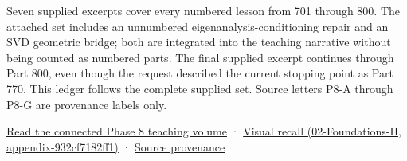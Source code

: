 Seven supplied excerpts cover every numbered lesson from 701 through 800. The attached set includes an unnumbered eigenanalysis-conditioning repair and an SVD geometric bridge; both are integrated into the teaching narrative without being counted as numbered parts. The final supplied excerpt continues through Part 800, even though the request described the current stopping point as Part 770. This ledger follows the complete supplied set. Source letters P8-A through P8-G are provenance labels only.

\hyperref[01-foundations-i-ch019-the-graphics-problem-hiding-inside-a-matrix-equation]{Read the connected Phase 8 teaching volume} · \href{../02-Foundations-II/main.pdf\#nameddest=appendix-932cf7182ff1}{Visual recall (02-Foundations-II, appendix-932cf7182ff1)} · \hyperref[appendix-a103e7846d21-phase-8---source-analysis-and-verification]{Source provenance}

